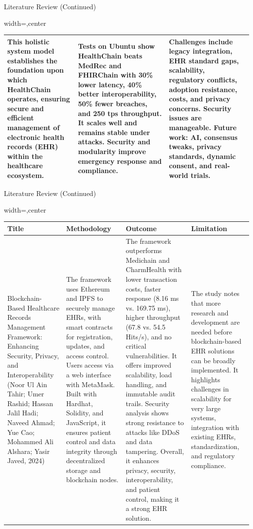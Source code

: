 \documentclass[10pt]{beamer}
\begin{document}
\begin{frame}{Literature Review (Continued)}
\begin{adjustbox}{width=\textwidth,center}
\begin{tabular}{p{3cm}p{3cm}p{3cm}p{3cm}}
This holistic system model establishes the foundation upon which HealthChain operates, ensuring secure and efficient management of electronic health records (EHR) within the healthcare ecosystem. & 
Tests on Ubuntu show HealthChain beats MedRec and FHIRChain with 30\% lower latency, 40\% better interoperability, 50\% fewer breaches, and 250 tps throughput. It scales well and remains stable under attacks. Security and modularity improve emergency response and compliance. & 
Challenges include legacy integration, EHR standard gaps, scalability, regulatory conflicts, adoption resistance, costs, and privacy concerns. Security issues are manageable. Future work: AI, consensus tweaks, privacy standards, dynamic consent, and real-world trials. \\
\bottomrule
\end{tabular}
\end{adjustbox}
\end{frame}

\begin{frame}{Literature Review (Continued)}
\tiny
\begin{adjustbox}{width=\textwidth,center}
\begin{tabular}{p{3cm}p{3cm}p{3cm}p{3cm}}
\toprule
\textbf{Title} & \textbf{Methodology} & \textbf{Outcome} & \textbf{Limitation} \\
\midrule
Blockchain-Based Healthcare Records Management Framework: Enhancing Security, Privacy, and Interoperability (Noor Ul Ain Tahir; Umer Rashid; Hassan Jalil Hadi; Naveed Ahmad; Yue Cao; Mohammed Ali Alshara; Yasir Javed, 2024) & 
The framework uses Ethereum and IPFS to securely manage EHRs, with smart contracts for registration, updates, and access control. Users access via a web interface with MetaMask. Built with Hardhat, Solidity, and JavaScript, it ensures patient control and data integrity through decentralized storage and blockchain nodes. & 
The framework outperforms Medichain and CharmHealth with lower transaction costs, faster response (8.16 ms vs. 169.75 ms), higher throughput (67.8 vs. 54.5 Hits/s), and no critical vulnerabilities. It offers improved scalability, load handling, and immutable audit trails. Security analysis shows strong resistance to attacks like DDoS and data tampering. Overall, it enhances privacy, security, interoperability, and patient control, making it a strong EHR solution. & 
The study notes that more research and development are needed before blockchain-based EHR solutions can be broadly implemented. It highlights challenges in scalability for very large systems, integration with existing EHRs, standardization, and regulatory compliance. \\
\bottomrule
\end{tabular}
\end{adjustbox}
\end{frame}
\end{document}
